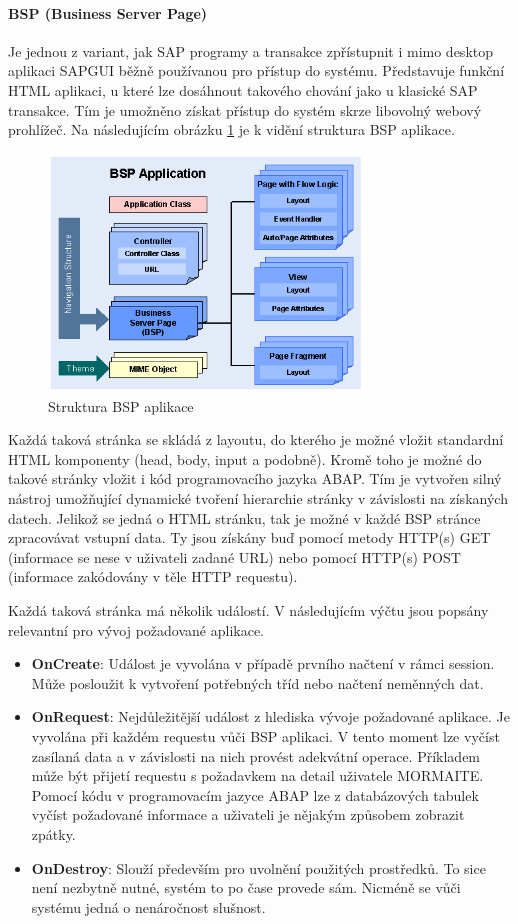 \documentclass[thesis=M,czech]{FITthesis}[2012/06/26]
\begin{document}
\paragraph{BSP (Business Server Page)} Je jednou z variant, jak SAP programy a transakce zpřístupnit i mimo desktop aplikaci SAPGUI běžně používanou pro přístup do systému. Představuje funkční HTML aplikaci, u které lze dosáhnout takového chování jako u klasické SAP transakce. Tím je umožněno získat přístup do systém skrze libovolný webový prohlížeč. Na následujícím obrázku \ref{img:bsp_structure} je k vidění struktura BSP aplikace. 
\begin{figure}[H]
	\centering
	\includegraphics[width=0.75\textwidth]{images/bsp.png}
	\caption{Struktura BSP aplikace}
	\label{img:bsp_structure}
\end{figure}
Každá taková stránka se skládá z layoutu, do kterého je možné vložit standardní HTML komponenty (head, body, input a podobně). Kromě toho je možné do takové stránky vložit i kód programovacího jazyka ABAP. Tím je vytvořen silný nástroj umožňující dynamické tvoření hierarchie stránky v závislosti na získaných datech. Jelikož se jedná o HTML stránku, tak je možné v každé BSP stránce zpracovávat vstupní data. Ty jsou získány  buď pomocí metody HTTP(s) GET (informace se nese v uživateli zadané URL) nebo pomocí HTTP(s) POST (informace zakódovány v těle HTTP requestu).

Každá taková stránka má několik událostí. V následujícím výčtu jsou popsány relevantní pro vývoj požadované aplikace. 
\begin{itemize}
	\item
	\textbf{OnCreate}: Událost je vyvolána v případě prvního načtení v rámci session. Může posloužit k vytvoření potřebných tříd nebo načtení neměnných dat.
	\item
	\textbf{OnRequest}: Nejdůležitější událost z hlediska vývoje požadované aplikace. Je vyvolána při každém requestu vůči BSP aplikaci. V tento moment lze vyčíst zasílaná data a v závislosti na nich provést adekvátní operace. Příkladem může být přijetí requestu s požadavkem na detail uživatele MORMAITE. Pomocí kódu v programovacím jazyce ABAP lze z databázových tabulek vyčíst požadované informace a uživateli je nějakým způsobem zobrazit zpátky.
	\item
	\textbf{OnDestroy}: Slouží především pro uvolnění použitých prostředků. To sice není nezbytně nutné, systém to po čase provede sám. Nicméně se vůči systému jedná o nenáročnost slušnost.
\end{itemize} 
\end{document}
